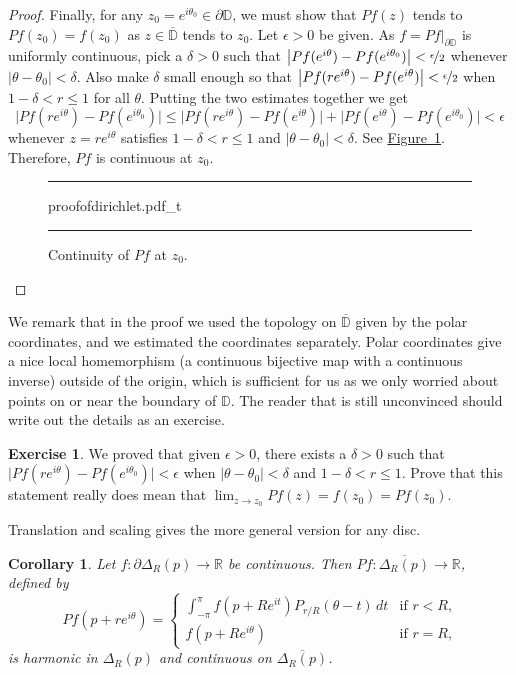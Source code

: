 \documentclass[12pt,openany]{book}
\newcommand{\sabs}[1]{\lvert {#1} \rvert}
\newcommand{\babs}[1]{\bigl\lvert {#1} \bigr\rvert}
\newcommand{\R}{{\mathbb{R}}}
\newcommand{\D}{{\mathbb{D}}}
\theoremstyle{plain}
\newtheorem{cor}[thm]{Corollary}
\theoremstyle{remark}
\theoremstyle{definition}
\newenvironment{exbox}{%
    \def\FrameCommand{\vrule width 1pt \relax\hspace{10pt}}%
    \MakeFramed{\advance\hsize-\width\FrameRestore}%
}{%
    \endMakeFramed
}
\newenvironment{myfig}{%
\begin{figure}[h!t]
\noindent\rule{\textwidth}{0.5pt}\vspace{12pt}\par\centering}%
{\par\noindent\rule{\textwidth}{0.5pt}
\end{figure}}
\theoremstyle{exercise}
\newtheorem{exercise}{Exercise}[section]
\theoremstyle{example}
\newcommand{\figureref}[1]{\hyperref[#1]{Figure~\ref*{#1}}}
\begin{document}
\begin{proof}
Finally, for any $z_0 = e^{i\theta_0} \in \partial \D$,
we must show that
$Pf(z)$ tends to $Pf(z_0)=f(z_0)$ as $z \in \overline{\D}$ tends to $z_0$.
Let $\epsilon > 0$ be given.  As $f = Pf|_{\partial \D}$ is
uniformly continuous, pick a $\delta > 0$ such that
$\babs{Pf(e^{i\theta})-Pf(e^{i\theta_0})} < \nicefrac{\epsilon}{2}$
whenever $\sabs{\theta-\theta_0} < \delta$.
Also make $\delta$ small enough so that $\babs{Pf(re^{i
\theta})-Pf(e^{i\theta})} < \nicefrac{\epsilon}{2}$
when $1 - \delta < r \leq 1$ for all $\theta$.
Putting the two estimates together we get
\begin{equation*}
\babs{Pf(re^{i\theta})-Pf(e^{i\theta_0})}
\leq
\babs{Pf(re^{i\theta})-Pf(e^{i\theta})}
+
\babs{Pf(e^{i\theta})-Pf(e^{i\theta_0})}
< \epsilon
\end{equation*}
whenever $z=re^{i\theta}$ satisfies $1 - \delta < r \leq 1$ and
$\sabs{\theta-\theta_0} < \delta$.
See \figureref{fig:proofofdirichlet}.
Therefore, $Pf$ is
continuous at $z_0$.
\begin{myfig}
{proofofdirichlet.pdf_t}
\caption{Continuity of $Pf$ at $z_0$.\label{fig:proofofdirichlet}}
\end{myfig}
\end{proof}

We remark that in the proof we used the topology on $\overline{\D}$
given by the polar coordinates, and we estimated the coordinates separately.
Polar coordinates give a nice local homemorphism
(a continuous bijective map with a continuous inverse) outside of
the origin, which is sufficient for us as we only worried about points
on or near the boundary of $\D$.  The reader that is still unconvinced
should write out the details as an exercise.

\begin{exbox}
\begin{exercise}
We proved that given $\epsilon > 0$, there exists a $\delta > 0$ such that
$\babs{Pf(re^{i\theta})-Pf(e^{i\theta_0})} < \epsilon$
when $\sabs{\theta-\theta_0} < \delta$ and
$1 - \delta < r \leq 1$.  Prove that this statement really does mean that
$\lim_{z \to z_0} Pf(z) = f(z_0) = Pf(z_0)$.
\end{exercise}
\end{exbox}

Translation and scaling gives the more general version for
any disc.

\begin{cor} \label{cor:dirichsol}
Let $f \colon \partial \Delta_R(p) \to \R$ be continuous.
Then
$Pf \colon \overline{\Delta_R(p)} \to \R$, defined by
%
\begin{equation*}
Pf(p + re^{i\theta})
=
\begin{cases}
\int_{-\pi}^\pi f(p+Re^{it}) P_{r/R}(\theta-t) \, dt
&
\text{if $r < R$,} \\
f(p+Re^{i\theta}) & \text{if $r=R$,}
\end{cases}
\end{equation*}
is harmonic in $\Delta_R(p)$ and continuous on $\overline{\Delta_R(p)}$.
\end{cor}
\end{document}
